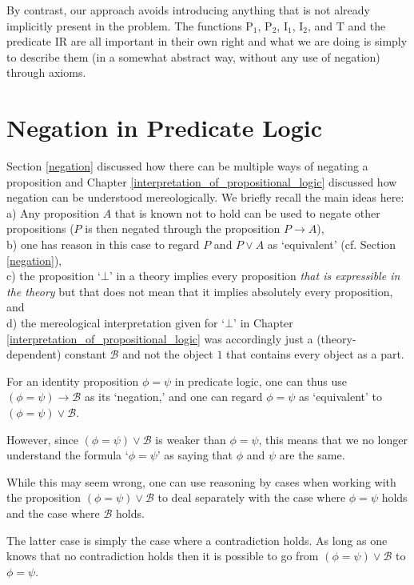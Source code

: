 \documentclass[12pt]{book}
\begin{document}
By contrast, our approach avoids introducing anything that is not already implicitly present in the problem. The functions $\mathrm{P}_1$, $\mathrm{P}_2$, $\mathrm{I}_1$, $\mathrm{I}_2$, and $\mathrm{T}$ and the predicate $\mathrm{IR}$ are all important in their own right and what we are doing is simply to describe them (in a somewhat abstract way, without any use of negation) through axioms.

\section{Negation in Predicate Logic} \label{negation_in_predicate_logic}
Section \ref{negation} discussed how there can be multiple ways of negating a proposition and Chapter \ref{interpretation_of_propositional_logic} discussed how negation can be understood mereologically. We briefly recall the main ideas here:\\
a) Any proposition $A$ that is known not to hold can be used to negate other propositions ($P$ is then negated through the proposition $P \rightarrow A$),\\
b) one has reason in this case to regard $P$ and $P \vee A$ as `equivalent' (cf. Section \ref{negation}),\\
c) the proposition `$\bot$' in a theory implies every proposition \textit{that is expressible in the theory} but that does not mean that it implies absolutely every proposition, and\\
d) the mereological interpretation given for `$\bot$' in Chapter \ref{interpretation_of_propositional_logic} was accordingly just a (theory-dependent) constant $\mathcal{B}$ and not the object $1$ that contains every object as a part.

For an identity proposition $\phi = \psi$ in predicate logic, one can thus use $(\phi = \psi) \rightarrow \mathcal{B}$ as its `negation,' and one can regard $\phi = \psi$ as `equivalent' to $(\phi = \psi) \vee \mathcal{B}$.

However, since $(\phi = \psi) \vee \mathcal{B}$ is weaker than $\phi = \psi$, this means that we no longer understand the formula `$\phi = \psi$' as saying that $\phi$ and $\psi$ are the same.

While this may seem wrong, one can use reasoning by cases when working with the proposition $(\phi = \psi) \vee \mathcal{B}$ to deal separately with the case where $\phi = \psi$ holds and the case where $\mathcal{B}$ holds.

The latter case is simply the case where a contradiction holds. As long as one knows that no contradiction holds then it is possible to go from $(\phi = \psi) \vee \mathcal{B}$ to $\phi = \psi$.
\end{document}
